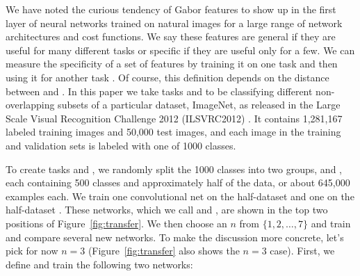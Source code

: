 We have noted the curious tendency of Gabor features to show up in the first layer of neural networks trained on natural images for a large range of network architectures and cost functions. We say these features are general if they are useful for many different tasks or specific if they are useful only for a few. We can measure the specificity of a set of features by training it on one task \dA and then using it for another task \dB.
Of course, this definition depends on the distance between \dA and \dB. In this paper we take tasks \dA and \dB to be classifying different non-overlapping subsets of a particular dataset,
ImageNet, as released in the Large Scale Visual Recognition Challenge 2012 (ILSVRC2012) \citep{imagenet_cvpr09}. It contains 1,281,167 labeled training images and 50,000 test images, and each image in the training and validation sets is labeled with one of 1000 classes.

To create tasks \dA and \dB, we randomly split the 1000 classes into two groups, \dA and \dB, each containing 500 classes and approximately half of the data, or about 645,000 examples each. We train one convolutional net on the half-dataset \dA and one on the half-dataset \dB. These networks, which we call  and , are shown in the top two positions of Figure~\ref{fig:transfer}.
We then choose an $n$ from $\{1, 2, \ldots, 7\}$ and train and compare several new networks. To make the discussion more concrete, let's pick for now $n=3$ (Figure~\ref{fig:transfer} also shows the $n=3$ case).
First, we define and train the following two networks:

